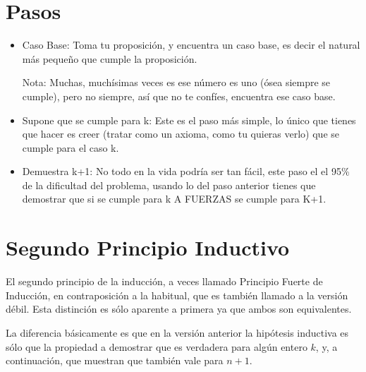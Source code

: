 \documentclass[12pt, fleqn]{report}                             %
\theoremstyle{break}                                            %
\begin{document}
            
            \section{Pasos}

                \begin{itemize}
                    \item Caso Base: 
                        Toma tu proposición, y encuentra un caso base, es decir el natural más
                        pequeño que cumple la proposición.

                        Nota: Muchas, muchísimas veces es ese número es uno (ósea siempre se cumple), pero no
                        siempre, así que no te confíes, encuentra ese caso base.

                    \item Supone que se cumple para k: Este es el paso más simple, lo único que tienes que hacer
                        es creer (tratar como un axioma, como tu quieras verlo) que se cumple para el caso k.

                    \item Demuestra k+1: No todo en la vida podría ser tan fácil, este paso el el 95\% de la
                        dificultad del problema, usando lo del paso anterior tienes que demostrar que si se
                        cumple para k A FUERZAS se cumple para K+1.

                \end{itemize}


        \clearpage
        \section{Segundo Principio Inductivo}

            El segundo principio de la inducción, a veces llamado Principio Fuerte de Inducción, 
            en contraposición a la habitual, que es también llamado a la versión débil. Esta distinción
            es sólo aparente a primera ya que ambos son equivalentes.

            La diferencia básicamente es que en la versión anterior la hipótesis inductiva es sólo que la
            propiedad a demostrar que es verdadera para algún entero $k$, y, a continuación,
            que muestran que también vale para $n+1$.
\end{document}

